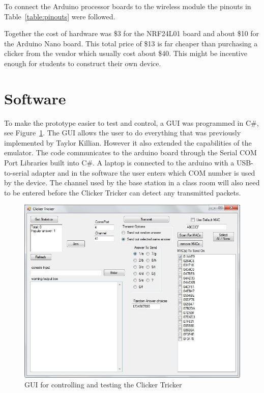 To connect the Arduino processor boards to the wireless module the pinouts in Table~\ref{table:pinouts} were followed.  

Together the cost of hardware was \$3 for the NRF24L01 board and about \$10 for the Arduino Nano board.  This total price of \$13 is far cheaper than purchasing a clicker from the vendor which usually cost about \$40.  This might be incentive enough for students to construct their own device.

\section{Software}
To make the prototype easier to test and control, a GUI was programmed in C\#, see Figure~\ref{img:GUI}.  The GUI allows the user to do everything that was previously implemented by Taylor Killian.  However it also extended the capabilities of the emulator. The code communicates to the arduino board through the Serial COM Port Libraries built into C\#. A laptop is connected to the arduino with a USB-to-serial adapter and in the software the user enters which COM number is used by the device. The channel used by the base station in a class room will also need to be entered before the Clicker Tricker can detect any transmitted packets.

\begin{figure}[t!]
\centering
  \includegraphics[scale=.8]{images/UI_ClickerTricker}
    \caption{GUI for controlling and testing the Clicker Tricker}
	\label{img:GUI}
\end{figure}

